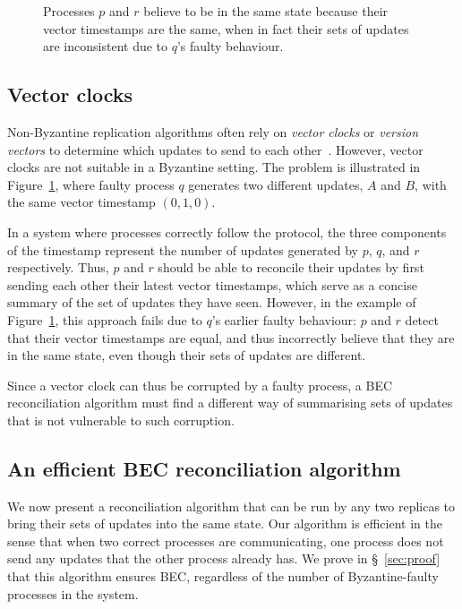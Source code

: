 \documentclass[a4paper,anonymous,USenglish]{lipics-v2019}
\begin{document}
\begin{figure}
    \centering
    
    \caption{Processes $p$ and $r$ believe to be in the same state because their vector timestamps are the same, when in fact their sets of updates are inconsistent due to $q$'s faulty behaviour.}
    \label{fig:vectorclocks}
\end{figure}

\subsection{Vector clocks}

Non-Byzantine replication algorithms often rely on \emph{vector clocks} or \emph{version vectors} to determine which updates to send to each other~\cite{Ahamad:1995,Lloyd:2011,Schwarz:1994}.
However, vector clocks are not suitable in a Byzantine setting.
The problem is illustrated in Figure~\ref{fig:vectorclocks}, where faulty process $q$ generates two different updates, $A$ and $B$, with the same vector timestamp $(0, 1, 0)$.

In a system where processes correctly follow the protocol, the three components of the timestamp represent the number of updates generated by $p$, $q$, and $r$ respectively.
Thus, $p$ and $r$ should be able to reconcile their updates by first sending each other their latest vector timestamps, which serve as a concise summary of the set of updates they have seen.
However, in the example of Figure~\ref{fig:vectorclocks}, this approach fails due to $q$'s earlier faulty behaviour: $p$ and $r$ detect that their vector timestamps are equal, and thus incorrectly believe that they are in the same state, even though their sets of updates are different.

Since a vector clock can thus be corrupted by a faulty process, a BEC reconciliation algorithm must find a different way of summarising sets of updates that is not vulnerable to such corruption.

\subsection{An efficient BEC reconciliation algorithm}

We now present a reconciliation algorithm that can be run by any two replicas to bring their sets of updates into the same state.
Our algorithm is efficient in the sense that when two correct processes are communicating, one process does not send any updates that the other process already has.
We prove in \S~\ref{sec:proof} that this algorithm ensures BEC, regardless of the number of Byzantine-faulty processes in the system.
\end{document}
